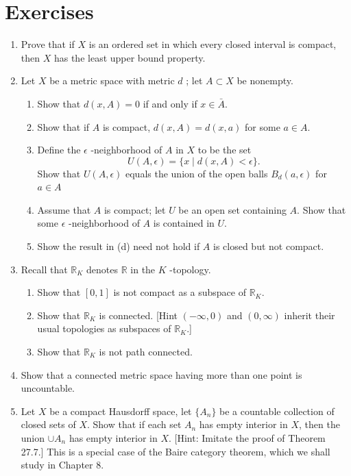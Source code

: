 \section*{Exercises}
\begin{enumerate}[itemsep=0.4em, parsep=0pt, topsep=0pt, partopsep=0pt, leftmargin=*, label=\arabic*., ref=\arabic*]
\item Prove that if \(X\) is an ordered set in which every closed interval is compact, then \(X\) has the least upper bound property.
\item Let \(X\) be a metric space with metric \(d\) ; let \(A \subset X\) be nonempty.
 \begin{enumerate}[itemsep=0.2em, parsep=0pt, topsep=0pt, partopsep=0pt, leftmargin=*, label=(\alph*), align=left]
 \item Show that \(d( {x,A}) = 0\) if and only if \(x \in \bar{A}\).
 \item Show that if \(A\) is compact, \(d( {x,A}) = d( {x,a})\) for some \(a \in A\).
 \item Define the \(\epsilon\) -neighborhood of \(A\) in \(X\) to be the set \[ U( {A,\epsilon }) = \{ x \mid d( {x,A}) < \epsilon \}. \] Show that \(U( {A,\epsilon })\) equals the union of the open balls \(B_{d}( {a,\epsilon })\) for \(a \in A\)
 \item Assume that \(A\) is compact; let \(U\) be an open set containing \(A\). Show that some \(\epsilon\) -neighborhood of \(A\) is contained in \(U\).
 \item Show the result in (d) need not hold if \(A\) is closed but not compact.
 \end{enumerate}
\item Recall that \(\mathbb{R}_{K}\) denotes \(\mathbb{R}\) in the \(K\) -topology.
 \begin{enumerate}[itemsep=0.2em, parsep=0pt, topsep=0pt, partopsep=0pt, leftmargin=*, label=(\alph*), align=left]
 \item Show that \([ {0,1}]\) is not compact as a subspace of \(\mathbb{R}_{K}\).
 \item Show that \(\mathbb{R}_{K}\) is connected. [Hint \(( {-\infty, 0})\) and \(( {0,\infty })\) inherit their usual topologies as subspaces of \(\mathbb{R}_{K}\).]
 \item Show that \(\mathbb{R}_{K}\) is not path connected.
 \end{enumerate}
\item Show that a connected metric space having more than one point is uncountable.
\item Let \(X\) be a compact Hausdorff space, let \(\{ A_{n}\}\) be a countable collection of closed sets of \(X\). Show that if each set \(A_{n}\) has empty interior in \(X\), then the union \(\cup {A}_{n}\) has empty interior in \(X\). [Hint: Imitate the proof of Theorem 27.7.] This is a special case of the Baire category theorem, which we shall study in Chapter 8.

\end{enumerate}
